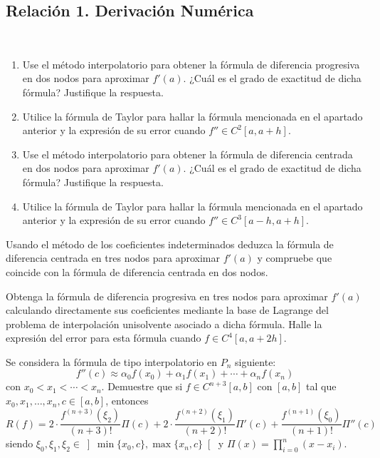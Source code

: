 \subsection{Relación 1. Derivación Numérica}
\setcounter{ejercicio}{0}


\begin{ejercicio}\label{ej:2.1.1}~
    \begin{enumerate}
        \item Use el método interpolatorio para obtener la fórmula de diferencia progresiva en dos nodos para aproximar $f'(a)$. ¿Cuál es el grado de exactitud de dicha fórmula? Justifique la respuesta.
        
        \item Utilice la fórmula de Taylor para hallar la fórmula mencionada en el apartado anterior y la expresión de su error cuando $f'' \in C^2[a, a + h]$.
        
        \item Use el método interpolatorio para obtener la fórmula de diferencia centrada en dos nodos para aproximar $f'(a)$. ¿Cuál es el grado de exactitud de dicha fórmula? Justifique la respuesta.
        
        \item Utilice la fórmula de Taylor para hallar la fórmula mencionada en el apartado anterior y la expresión de su error cuando $f'' \in C^3[a - h, a + h]$.
    \end{enumerate}    
\end{ejercicio}

\begin{ejercicio}\label{ej:2.1.2}
    Usando el método de los coeficientes indeterminados deduzca la fórmula de diferencia centrada en tres nodos para aproximar $f'(a)$ y compruebe que coincide con la fórmula de diferencia centrada en dos nodos.
\end{ejercicio}

\begin{ejercicio}\label{ej:2.1.3}
    Obtenga la fórmula de diferencia progresiva en tres nodos para aproximar $f'(a)$ calculando directamente sus coeficientes mediante la base de Lagrange del problema de interpolación unisolvente asociado a dicha fórmula. Halle la expresión del error para esta fórmula cuando $f \in C^4[a, a + 2h]$.
\end{ejercicio}

\begin{ejercicio}\label{ej:2.1.4}
    Se considera la fórmula de tipo interpolatorio en $P_n$ siguiente:
    \[
    f''(c) \approx \alpha_0 f(x_0) + \alpha_1 f(x_1) + \cdots + \alpha_n f(x_n)
    \]
    con $x_0 < x_1 < \cdots < x_n$. Demuestre que si $f \in C^{n+3}[a, b]$ con $[a, b]$ tal que $x_0, x_1, \ldots, x_n, c \in [a, b]$, entonces
    \[
    R(f) = 2\cdot \frac{f^{(n+3)}(\xi_2)}{(n + 3)!}\Pi(c) + 2\cdot \frac{f^{(n+2)}(\xi_1)}{(n + 2)!}\Pi'(c) + \frac{f^{(n+1)}(\xi_0)}{(n + 1)!}\Pi''(c)
    \]
    siendo $\xi_0, \xi_1, \xi_2 \in \left] \min\{x_0, c\}, \max\{x_n, c\} \right[$ y $\Pi(x) = \prod\limits_{i=0}^{n}(x - x_i)$.
\end{ejercicio}

